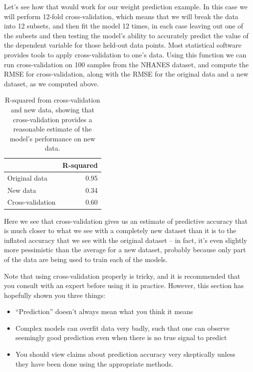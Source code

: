 \documentclass[12pt,]{book}
\providecommand{\tightlist}{%
  \setlength{\itemsep}{0pt}\setlength{\parskip}{0pt}}
\theoremstyle{definition}
\theoremstyle{definition}
\theoremstyle{definition}
\theoremstyle{remark}
\begin{document}
Let's see how that would work for our weight prediction example. In this case we will perform 12-fold cross-validation, which means that we will break the data into 12 subsets, and then fit the model 12 times, in each case leaving out one of the subsets and then testing the model's ability to accurately predict the value of the dependent variable for those held-out data points. Most statistical software provides tools to apply cross-validation to one's data. Using this function we can run cross-validation on 100 samples from the NHANES dataset, and compute the RMSE for cross-validation, along with the RMSE for the original data and a new dataset, as we computed above.

\begin{table}

\caption{\label{tab:unnamed-chunk-109}R-squared from cross-validation and new data, showing that cross-validation provides a reasonable estimate of the model's performance on new data.}
\centering
\begin{tabular}[t]{l|r}
\hline
  & R-squared\\
\hline
Original data & 0.95\\
\hline
New data & 0.34\\
\hline
Cross-validation & 0.60\\
\hline
\end{tabular}
\end{table}

Here we see that cross-validation gives us an estimate of predictive accuracy that is much closer to what we see with a completely new dataset than it is to the inflated accuracy that we see with the original dataset -- in fact, it's even slightly more pessimistic than the average for a new dataset, probably because only part of the data are being used to train each of the models.

Note that using cross-validation properly is tricky, and it is recommended that you consult with an expert before using it in practice. However, this section has hopefully shown you three things:

\begin{itemize}
\tightlist
\item
  ``Prediction'' doesn't always mean what you think it means
\item
  Complex models can overfit data very badly, such that one can observe seemingly good prediction even when there is no true signal to predict
\item
  You should view claims about prediction accuracy very skeptically unless they have been done using the appropriate methods.
\end{itemize}
\end{document}
